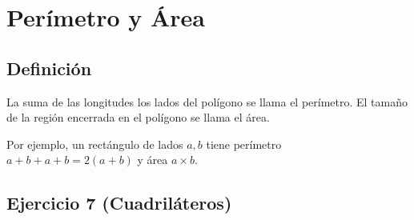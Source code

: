 \section{Perímetro y Área}

\subsection{Definición}

La suma de las longitudes los lados del polígono se llama el perímetro.
El tamaño de la región encerrada en el polígono se llama el área.

Por ejemplo, un rectángulo de lados $a,b$ tiene perímetro
$a+b+a+b=2{(a+b)}$ y área $a \times b$.

\begin{center}
\end{center}

\subsection{Ejercicio 7 (Cuadriláteros)}

